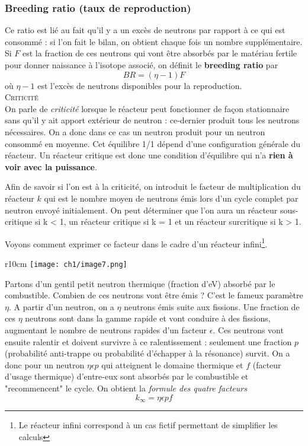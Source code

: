 \subsubsection{Breeding ratio (taux de reproduction)}
Ce ratio est lié au fait qu'il y a un excès de neutrons par rapport à ce qui est consommé : si l'on 
fait le bilan, on obtient chaque fois un nombre supplémentaire. Si $F$ est la fraction de ces 
neutrons qui vont être absorbés par le matériau fertile pour donner naissance à l'isotope associé, 
on définit le \textbf{breeding ratio} par
\begin{equation}
BR = (\eta-1)F
\end{equation}
où $\eta-1$ est l'excès de neutrons disponibles pour la reproduction.\\

\textsc{Criticité}\\
On parle de \textit{criticité} lorsque le réacteur peut fonctionner de façon stationnaire sans 
qu'il y ait apport extérieur de neutron : ce-dernier produit tous les neutrons nécessaires.
On a donc dans ce cas un neutron produit pour un neutron consommé en moyenne.
Cet équilibre 1/1 dépend d'une configuration générale du réacteur. Un réacteur critique est donc 
une condition d'équilibre qui n'a \textbf{rien à voir avec la puissance}.

\newpage
Afin de savoir si l'on est à la criticité, on introduit le facteur de multiplication du réacteur $k$ qui est 
le nombre moyen de neutrons émis lors d'un cycle complet par neutron envoyé initialement. 
On peut déterminer que l'on aura un réacteur sous-critique si k < 1, un réacteur critique si k = 1 et
un réacteur surcritique si k > 1.

Voyons comment exprimer ce facteur dans le cadre d'un réacteur infini\footnote{Le réacteur infini correspond
à un cas fictif permettant de simplifier les calculs}. \\

	\begin{wrapfigure}[14]{r}{10cm}
	\vspace{-5mm}
	\texttt{[image: ch1/image7.png]}
	\end{wrapfigure}
	
Partons d'un gentil petit neutron thermique (fraction d'eV) absorbé par le combustible. Combien 
de ces neutrons vont être émis ? C'est le fameux paramètre $\eta$. A partir d'un neutron, on a 
$\eta$ neutrons émis suite aux fissions. Une fraction de ces $\eta$ neutrons sont dans 
la gamme rapide et vont conduire à des fissions, augmentant le nombre de neutrons rapides d'un facteur $\epsilon$. Ces
neutrons vont ensuite ralentir et doivent survivre à ce ralentissement : seulement une fraction 
$p$ (probabilité anti-trappe ou probabilité d'échapper à la résonance) survit. On a donc pour un neutron $\eta\epsilon p$ qui atteignent 
le domaine thermique et $f$ (facteur d'usage thermique) d'entre-eux sont absorbés par le combustible et "recommencent" le cycle. 
On obtient la \textit{formule des quatre facteurs}
\begin{equation}
k_\infty = \eta\epsilon  pf
\end{equation}

